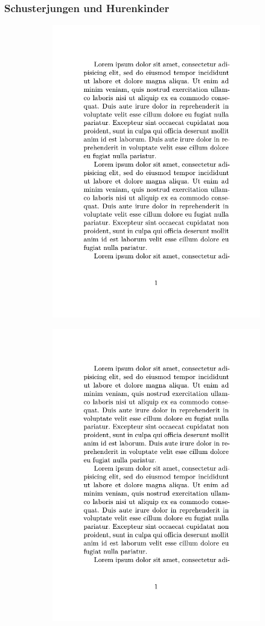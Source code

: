 \documentclass[aspectratio=169, 10pt]{beamer}
\begin{document}
\begin{frame}[fragile]
    \frametitle{Schusterjungen und Hurenkinder}
    \begin{figure}
        \centering%
        \begin{subfigure}{.35\textwidth}
            \includegraphics[page=1,width=0.8\linewidth]{images/hurenkind/hurenkind.pdf}
        \end{subfigure}%
        \begin{subfigure}{.35\textwidth}
            \includegraphics[page=2,width=0.8\linewidth]{images/hurenkind/hurenkind.pdf}

\end{subfigure}
\end{figure}
\end{frame}
\end{document}
